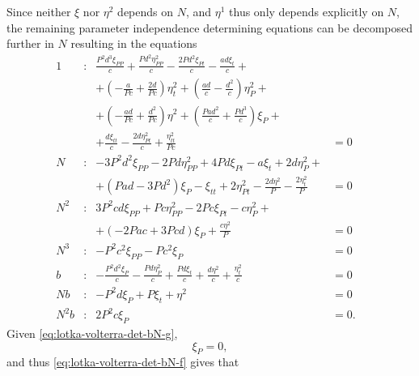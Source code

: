 Since neither \(\xi\) nor \(\eta^2\) depends on \(N\), and \(\eta^1\) thus only depends explicitly on \(N\), the remaining parameter independence determining equations  can be decomposed further in \(N\) resulting in the equations
\begin{subequations}
  \begin{flalign}
    1 & : & \frac{P^{2} d^{3} \xi_{PP}}{c} + \frac{P d^{2} \eta^2_{PP}}{c} - \frac{2 P d^{2} \xi_{Pt}}{c} - \frac{a d \xi_{t}}{c} +&&\\&&+ \left(- \frac{a}{P c} + \frac{2 d}{P c}\right) \eta^2_{t} + \left(\frac{a d}{c} - \frac{d^{2}}{c}\right) \eta^2_{P} +&&\\&&+ \left(- \frac{a d}{P c} + \frac{d^{2}}{P c}\right) \eta^{2} + \left(\frac{P a d^{2}}{c} + \frac{P d^{3}}{c}\right) \xi_{P} +&&\\&&+ \frac{d \xi_{tt}}{c} - \frac{2 d \eta^2_{Pt}}{c} + \frac{\eta^2_{tt}}{P c} &= 0 &\label{eq:lotka-volterra-det-bN-a}\\
    N & : & - 3 P^{2} d^{2} \xi_{PP} - 2 P d \eta^2_{PP} + 4 P d \xi_{Pt} - a \xi_{t} + 2 d \eta^2_{P} +&&\\&&+ \left(P a d - 3 P d^{2}\right) \xi_{P} - \xi_{tt} + 2 \eta^2_{Pt} - \frac{2 d \eta^{2}}{P} - \frac{2 \eta^2_{t}}{P} &= 0 &\label{eq:lotka-volterra-det-bN-b}\\
    N^{2} & : & 3 P^{2} c d \xi_{PP} + P c \eta^2_{PP} - 2 P c \xi_{Pt} - c \eta^2_{P} +&&\\&&+ \left(- 2 P a c + 3 P c d\right) \xi_{P} + \frac{c \eta^{2}}{P} &= 0 &\label{eq:lotka-volterra-det-bN-c}\\
    N^{3} & : & - P^{2} c^{2} \xi_{PP} - P c^{2} \xi_{P} &= 0 &\label{eq:lotka-volterra-det-bN-d}\\
    b & : & - \frac{P^{2} d^{2} \xi_{P}}{c} - \frac{P d \eta^2_{P}}{c} + \frac{P d \xi_{t}}{c} + \frac{d \eta^{2}}{c} + \frac{\eta^2_{t}}{c} &= 0 &\label{eq:lotka-volterra-det-bN-e}\\
    N b & : & - P^{2} d \xi_{P} + P \xi_{t} + \eta^{2} &= 0 &\label{eq:lotka-volterra-det-bN-f}\\
    N^{2} b & : & 2 P^{2} c \xi_{P} &= 0. &\label{eq:lotka-volterra-det-bN-g}
  \end{flalign}
\end{subequations}
Given \cref{eq:lotka-volterra-det-bN-g},
\begin{equation*}
  \xi_{P} = 0,
\end{equation*}
and thus \cref{eq:lotka-volterra-det-bN-f} gives that

